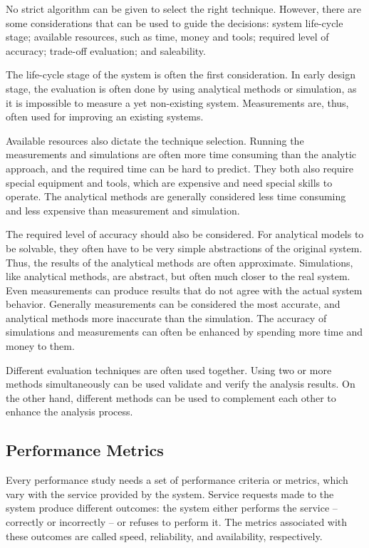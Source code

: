 No strict  algorithm can be given to select the right technique. However, there are some considerations that can be used to guide the decisions: system life-cycle stage; available resources, such as time, money and tools; required level of accuracy; trade-off evaluation; and saleability. \cite{jain:1991:AOCSPA}

The life-cycle stage of the system is often the first consideration. In early design stage, the evaluation is often done by using analytical methods or simulation, as it is impossible to measure a yet non-existing system. Measurements are, thus, often used for improving an existing systems. \cite{jain:1991:AOCSPA}

Available resources also dictate the technique selection. Running the measurements and simulations are often more time consuming \cite{Fujimoto:1990:PDE} than the analytic approach, and the required time can be hard to predict. They both also require special equipment and tools, which are expensive and need special skills to operate. The analytical methods are generally considered less time consuming and less expensive than measurement and simulation.
\cite{jain:1991:AOCSPA}

The required level of accuracy should also be considered. For analytical models to be solvable, they often have to be very simple abstractions of the original system. Thus, the results of the analytical methods are often approximate. Simulations, like analytical methods, are abstract, but often much closer to the real system. Even measurements can produce results that do not agree with the actual system behavior. Generally measurements can be considered the most accurate, and analytical methods more inaccurate than the simulation. The accuracy of simulations and measurements can often be enhanced by spending more time and money to them. \cite{jain:1991:AOCSPA}

Different evaluation techniques are often used together. Using two or more methods simultaneously can be used validate and verify the analysis results. On the other hand, different methods can be used to complement each other to enhance the analysis process. \cite{jain:1991:AOCSPA}


\subsection{Performance Metrics}
Every performance study needs a set of performance criteria or metrics, which vary with the service provided by the system. Service requests made to the system produce different outcomes: the system either performs the service -- correctly or incorrectly -- or refuses to perform it. The metrics associated with these outcomes are called speed, reliability, and availability, respectively. \cite{jain:1991:AOCSPA}

